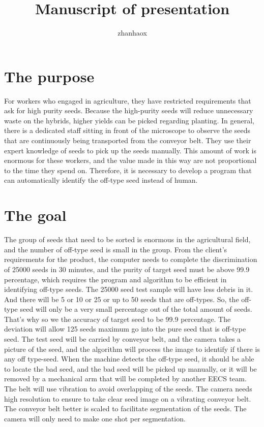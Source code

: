 \documentclass{article}
\title{Manuscript of presentation}
\author{zhanhaox }
\begin{document}
\maketitle

\section{The purpose}
For workers who engaged in agriculture, they have restricted requirements that ask for high purity seeds. Because the high-purity seeds will reduce unnecessary waste on the hybrids, higher yields can be picked regarding planting. 
In general, there is a dedicated staff sitting in front of the microscope to observe the seeds that are continuously being transported from the conveyor belt. They use their expert knowledge of seeds to pick up the seeds manually. This amount of work is enormous for these workers, and the value made in this way are not proportional to the time they spend on.
Therefore, it is necessary to develop a program that can automatically identify the off-type seed instead of human. 

\section{The goal}
The group of seeds that need to be sorted is enormous in the agricultural field, and the number of off-type seed is small in the group. From the client’s requirements for the product, the computer needs to complete the discrimination of 25000 seeds in 30 minutes, and the purity of target seed must be above 99.9 percentage, which requires the program and algorithm to be efficient in identifying off-type seeds. The 25000 seed test sample will have less debris in it. And there will be 5 or 10 or 25 or up to 50 seeds that are off-types. So, the off-type seed will only be a very small percentage out of the total amount of seeds. That’s why so we the accuracy of target seed to be 99.9 percentage. The deviation will allow 125 seeds maximum go into the pure seed that is off-type seed. The test seed will be carried by conveyor belt, and the camera takes a picture of the seed, and the algorithm will process the image to identify if there is any off type-seed. When the machine detects the off-type seed, it should be able to locate the bad seed, and the bad seed will be picked up manually, or it will be removed by a mechanical arm that will be completed by another EECS team. The belt will use vibration to avoid overlapping of the seeds. The camera needs high resolution to ensure to take clear seed image on a vibrating conveyor belt. The conveyor belt better is scaled to facilitate segmentation of the seeds. The camera will only need to make one shot per segmentation. 
\end{document}
